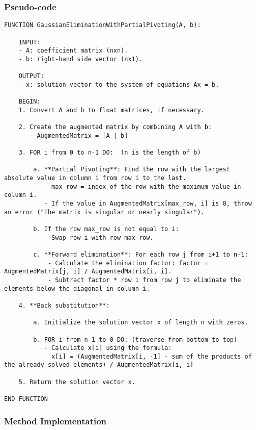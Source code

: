 \documentclass{article}
\begin{document}
        \subsubsection{Pseudo-code}
\begin{lstlisting}
FUNCTION GaussianEliminationWithPartialPivoting(A, b):

    INPUT:
    - A: coefficient matrix (nxn).
    - b: right-hand side vector (nx1).

    OUTPUT:
    - x: solution vector to the system of equations Ax = b.

    BEGIN:
    1. Convert A and b to float matrices, if necessary.

    2. Create the augmented matrix by combining A with b:
       - AugmentedMatrix = [A | b]

    3. FOR i from 0 to n-1 DO:  (n is the length of b)

        a. **Partial Pivoting**: Find the row with the largest absolute value in column i from row i to the last.
           - max_row = index of the row with the maximum value in column i.
           - If the value in AugmentedMatrix[max_row, i] is 0, throw an error ("The matrix is singular or nearly singular").

        b. If the row max_row is not equal to i:
           - Swap row i with row max_row.

        c. **Forward elimination**: For each row j from i+1 to n-1:
            - Calculate the elimination factor: factor = AugmentedMatrix[j, i] / AugmentedMatrix[i, i].
            - Subtract factor * row i from row j to eliminate the elements below the diagonal in column i.

    4. **Back substitution**:

        a. Initialize the solution vector x of length n with zeros.

        b. FOR i from n-1 to 0 DO: (traverse from bottom to top)
           - Calculate x[i] using the formula:
             x[i] = (AugmentedMatrix[i, -1] - sum of the products of the already solved elements) / AugmentedMatrix[i, i]

    5. Return the solution vector x.

END FUNCTION
\end{lstlisting}

        \subsubsection{Method Implementation}
\end{document}

